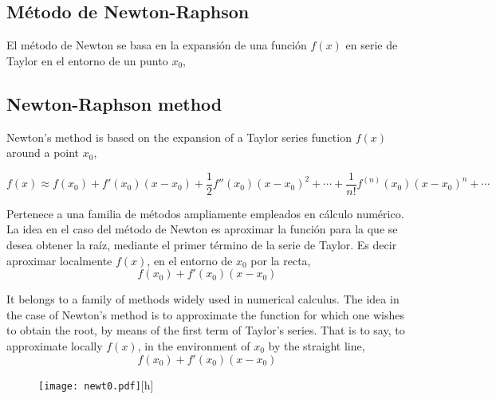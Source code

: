 \begin{paracol}{2}
\subsection{Método de Newton-Raphson}
El método de Newton se basa en la expansión de una función $f(x)$ en serie de Taylor en el entorno de un punto $x_0$,

\switchcolumn
\subsection{Newton-Raphson method}
Newton's method is based on the expansion of a Taylor series function $f(x)$ around a point $x_0$,
\end{paracol}
\begin{equation*}
f(x)\approx f(x_0)+f'(x_0)(x-x_0)+\frac{1}{2}f''(x_0)(x-x_0)^2+\cdots+\frac{1}{n!}f^{(n)}(x_0)(x-x_0)^n+\cdots
\end{equation*}

\begin{paracol}{2}
 Pertenece a una familia de métodos ampliamente empleados en cálculo numérico. La idea en el caso del método de Newton es aproximar la función para la que se desea obtener la raíz, mediante el primer término de la serie de Taylor. Es decir aproximar localmente $f(x)$, en el entorno de $x_0$ por la recta,
\begin{equation*}
 f(x_0)+f'(x_0)(x-x_0)
\end{equation*}

\switchcolumn

 It belongs to a family of methods widely used in numerical calculus. The idea in the case of Newton's method is to approximate the function for which one wishes to obtain the root, by means of the first term of Taylor's series. That is to say, to approximate locally $f(x)$, in the environment of $x_0$ by the straight line,
\begin{equation*}
 f(x_0)+f'(x_0)(x-x_0)
\end{equation*}
\end{paracol}

\begin{figure}[h]
\centering
\texttt{[image: newt0.pdf]}[h]
\label{fig:newton1}
\end{figure}

